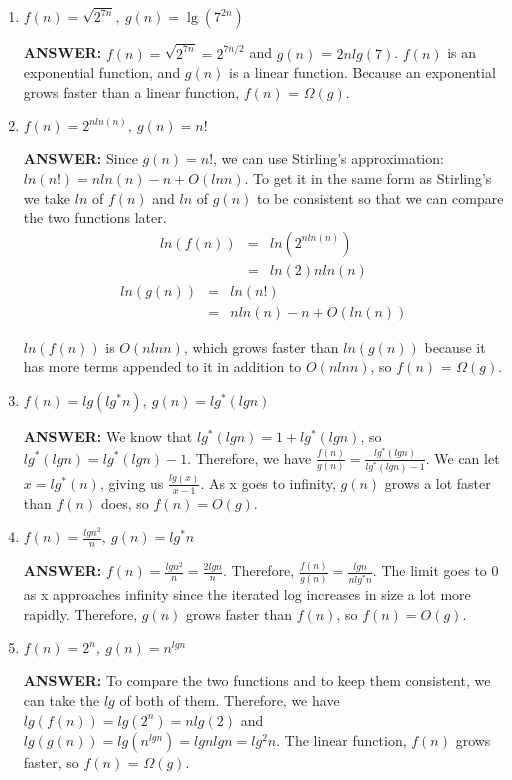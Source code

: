 \documentclass{article}
\begin{document}
\begin{enumerate}
\item $f(n) = \sqrt{2^{7n}},\ g(n) = \lg({7^{2n}})$

{\bfseries ANSWER: }$f(n) = \sqrt{2^{7n}} = 2^{7n/2}$ and $g(n)$ = $2n lg(7)$. $f(n)$ is an exponential function, and $g(n)$ is a linear function. Because an exponential grows faster than a linear function, $f(n)$ = $\Omega(g)$. 

\item $f(n) = 2^{nln(n)},\ g(n) = n!$

{\bfseries ANSWER: }Since $g(n) = n!$, we can use Stirling's approximation: $ln(n!) = n ln(n) - n + O(ln n)$. To get it in the same form as Stirling's we take $ln$ of $f(n)$ and $ln$ of $g(n)$ to be consistent so that we can compare the two functions later.
\begin{eqnarray*}
	ln(f(n)) &=& ln(2^{nln(n)}) \\
		&=& ln(2)nln(n)
\end{eqnarray*}
\begin{eqnarray*}
	ln(g(n)) &=& ln(n!) \\
		&=& nln(n)-n+O(ln(n))	
\end{eqnarray*}

$ln(f(n))$ is $O(nlnn)$, which grows faster than $ln(g(n))$ because it has more terms appended to it in addition to $O(nlnn)$, so $f(n)$ = $\Omega(g)$.

\item $f(n) = lg(lg^*n),\  g(n) = lg^*(lgn)$


{\bfseries ANSWER: }We know that $lg^*(lgn)=1+lg^*(lgn)$, so $lg^*(lgn)=lg^*(lgn)-1$. Therefore, we have $\frac{f(n)}{g(n)}= \frac{lg^*(lgn)}{lg^*(lgn)-1}$. We can let $x=lg^*(n)$, giving us $\frac{lg(x)}{x-1}$. As x goes to infinity, $g(n)$ grows a lot faster than $f(n)$ does, so $f(n) = O(g)$.


\item $f(n) = \frac{lgn^2}{n},\ g(n) = lg^*n$

{\bfseries ANSWER: } $f(n)=\frac{lgn^2}{n}=\frac{2lgn}{n}$. Therefore, $\frac{f(n)}{g(n)}=\frac{lgn}{nlg^*n}$. The limit goes to 0 as x approaches infinity since the iterated log increases in size a lot more rapidly. Therefore, $g(n)$ grows faster than $f(n)$, so $f(n) = O(g)$.

\item $f(n) = 2^n,\ g(n) = n^{lgn}$

{\bfseries ANSWER: }To compare the two functions and to keep them consistent, we can take the $lg$ of both of them. Therefore, we have $lg(f(n))=lg(2^n)=nlg(2)$ and $lg(g(n))=lg(n^{lgn})=lgnlgn=lg^2n$. The linear function, $f(n)$ grows faster, so $f(n)$ = $\Omega(g)$.


\end{enumerate}
\end{document}
